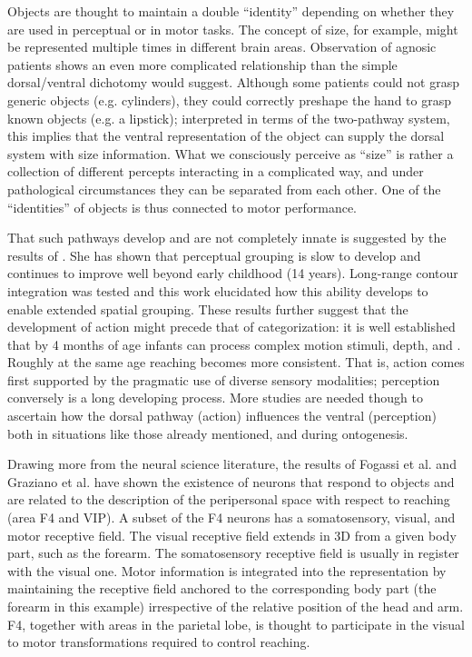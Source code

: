 
Objects are thought to maintain a double ``identity'' depending on
whether they are used in perceptual or in motor tasks. The concept of
size, for example, might be represented multiple times in different
brain areas. Observation of agnosic
patients \cite{jeannerod97cognitive} shows an even more complicated
relationship than the simple dorsal/ventral dichotomy would
suggest.  Although some patients could not grasp generic objects
(e.g. cylinders), they could correctly preshape the hand to grasp
known objects (e.g. a lipstick); interpreted in terms of the
two-pathway system, this implies that the ventral representation of
the object can supply the dorsal system with size information. What we
consciously perceive as ``size'' is rather a collection of different
percepts interacting in a complicated way, and under pathological
circumstances they can be separated from each other. One of the
``identities'' of objects is thus connected to motor performance.

That such pathways develop and are not completely innate is suggested
by the results of \cite{kovacs00human}. She has shown that
perceptual grouping is slow to develop and continues to improve well
beyond early childhood (14 years). Long-range contour integration was
tested and this work elucidated how this ability develops to enable
extended spatial grouping. These results further suggest that the
development of action might precede that of categorization: it is well
established that by 4 months of age infants can process complex
motion stimuli, depth, and \ahhcolor{}.  Roughly at the same age reaching
becomes more consistent.  That is, action comes first
supported by the pragmatic use of diverse sensory modalities;
perception conversely is a long developing process. More studies are
needed though to ascertain how the dorsal pathway (action) influences
the ventral (perception) both in situations like those
already mentioned, and during ontogenesis.

Drawing more from the neural science literature, the results of Fogassi et al.
\cite{fogassi96coding} and Graziano et al. \cite{graziano-hu-gross-1997} have 
shown the existence of neurons that respond to objects and are related to the
description of the peripersonal space with respect to reaching (area F4 and VIP).
A subset of the F4 neurons has a somatosensory, visual, and motor receptive
field. The visual receptive field extends in 3D from a given body part, such
as the forearm. The somatosensory receptive field is usually in register with
the visual one. Motor information is integrated into the representation 
by maintaining the receptive field anchored to the corresponding body part
(the forearm in this example) irrespective of the relative position of the
head and arm. F4, together with areas in the parietal lobe, is thought to 
participate in the visual to motor transformations required to control 
reaching.

